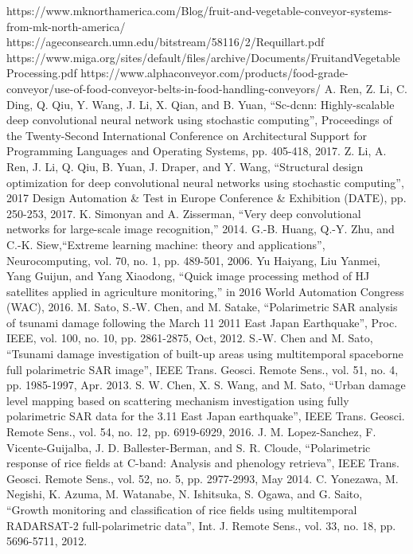 \documentclass[conference]{IEEEtran}
\begin{document}
	\begin{thebibliography}{00}
		 https://www.mknorthamerica.com/Blog/fruit-and-vegetable-conveyor-systems-from-mk-north-america/
		 https://ageconsearch.umn.edu/bitstream/58116/2/Requillart.pdf
		 https://www.miga.org/sites/default/files/archive/Documents/FruitandVegetableProcessing.pdf
		 https://www.alphaconveyor.com/products/food-grade-conveyor/use-of-food-conveyor-belts-in-food-handling-conveyors/
		 A. Ren, Z. Li, C. Ding, Q. Qiu, Y. Wang, J. Li, X. Qian, and B. Yuan, ``Sc-dcnn: Highly-scalable deep convolutional neural network using stochastic computing'', Proceedings of the Twenty-Second International Conference on Architectural Support for Programming Languages and Operating Systems, pp. 405-418, 2017.
		 Z. Li, A. Ren, J. Li, Q. Qiu, B. Yuan, J. Draper, and Y. Wang, ``Structural design optimization for deep convolutional neural networks using stochastic computing'', 2017 Design Automation \& Test in Europe Conference \& Exhibition (DATE), pp. 250-253, 2017.
		 K. Simonyan and A. Zisserman, ``Very deep convolutional networks for large-scale image recognition,'' 2014.
		 G.-B. Huang, Q.-Y. Zhu, and C.-K. Siew,``Extreme learning machine: theory and applications'', Neurocomputing, vol. 70, no. 1, pp. 489-501, 2006.
		 Yu Haiyang, Liu Yanmei, Yang Guijun, and Yang Xiaodong, ``Quick image processing method of HJ satellites applied in agriculture monitoring,'' in 2016 World Automation Congress (WAC), 2016.
		 M. Sato, S.-W. Chen, and M. Satake, ``Polarimetric SAR analysis of tsunami damage following the March 11 2011 East Japan Earthquake'', Proc. IEEE, vol. 100, no. 10, pp. 2861-2875, Oct, 2012.
		 S.-W. Chen and M. Sato, ``Tsunami damage investigation of built-up areas using multitemporal spaceborne full polarimetric SAR image'', IEEE Trans. Geosci. Remote Sens., vol. 51, no. 4, pp. 1985-1997, Apr. 2013.
		 S. W. Chen, X. S. Wang, and M. Sato, ``Urban damage level mapping based on scattering mechanism investigation using fully polarimetric SAR data for the 3.11 East Japan earthquake'', IEEE Trans. Geosci. Remote Sens., vol. 54, no. 12, pp. 6919-6929, 2016.
		 J. M. Lopez-Sanchez, F. Vicente-Guijalba, J. D. Ballester-Berman, and S. R. Cloude, ``Polarimetric response of rice fields at C-band: Analysis and phenology retrieva'', IEEE Trans. Geosci. Remote Sens., vol. 52, no. 5, pp. 2977-2993, May 2014.
		 C. Yonezawa, M. Negishi, K. Azuma, M. Watanabe, N. Ishitsuka, S. Ogawa, and G. Saito, ``Growth monitoring and classification of rice fields using multitemporal RADARSAT-2 full-polarimetric data'', Int. J. Remote Sens., vol. 33, no. 18, pp. 5696-5711, 2012.

\end{thebibliography}
\end{document}

